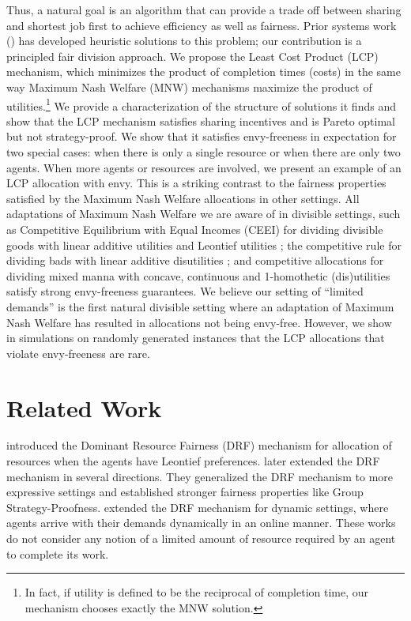 \documentclass[letterpaper]{article} %
\theoremstyle{definition}
\begin{document}
Thus, a natural goal is an algorithm that can provide a trade off between sharing and shortest job first to achieve efficiency as well as fairness.  
Prior systems work (\citet{Grandl2016Carbyne}) has developed heuristic solutions to this problem; our contribution is a principled fair division approach.
We propose the Least Cost Product (LCP) mechanism, which minimizes the product of completion times (costs) in the same way Maximum Nash Welfare (MNW) mechanisms maximize the product of utilities.\footnote{In fact, if utility is defined to be the reciprocal of completion time, our mechanism chooses exactly the MNW  solution.} We provide a characterization of the structure of solutions it finds and show that the LCP mechanism satisfies sharing incentives and is Pareto optimal but not strategy-proof. We show that it satisfies envy-freeness in expectation for two special cases: when there is only a single resource or when there are only two agents. When more agents or resources are involved, we present an example of an LCP allocation with envy. This is a striking contrast to the fairness properties satisfied by the Maximum Nash Welfare allocations in other settings. All adaptations of Maximum Nash Welfare we are aware of in divisible settings, such as Competitive Equilibrium with Equal Incomes (CEEI) for dividing divisible goods with linear additive utilities  \cite{VARIAN197463, moulin2004fair} and Leontief utilities \cite{Ghodsi2011drf, goel2019markets}; the competitive rule for dividing bads with linear additive disutilities \cite{bogomolnaia2019dividing}; and competitive allocations for dividing mixed manna with concave, continuous and 1-homothetic (dis)utilities \cite{bogomolnaia2017competitive} satisfy strong envy-freeness guarantees. We believe our setting of ``limited demands'' is the first natural divisible setting where an adaptation of Maximum Nash Welfare has resulted in allocations not being envy-free. However, we show in simulations on randomly generated instances that the LCP allocations that violate envy-freeness are rare.

\section{Related Work} \label{related-work}

\citeauthor{Ghodsi2011drf}  introduced the Dominant Resource Fairness (DRF) mechanism for allocation of resources when the agents have Leontief preferences. \citeauthor{parkes2015beyond}  later extended the DRF mechanism in several directions. They generalized the DRF mechanism to more expressive settings and established stronger fairness properties like Group Strategy-Proofness. \citeauthor{kash2014no}  extended the DRF mechanism for dynamic settings, where agents arrive with their demands dynamically in an online manner. These works do not consider any notion of a limited amount of resource required by an agent to complete its work.
\end{document}

